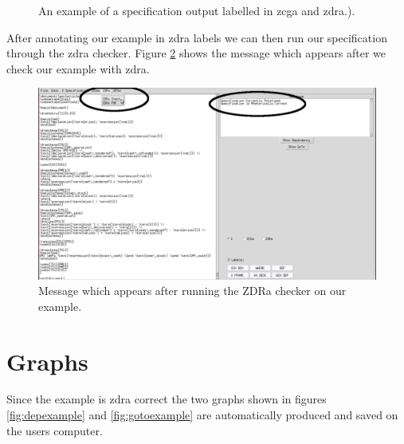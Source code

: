 \begin{figure}[H]
\begin{minipage}{0.45\textwidth}
\vspace{-0.18in}
\caption{An example of a specification output labelled in \gls{zcga} and \gls{zdra}.).\label{fig:zdrazcgaout}}
\vspace{-0.2in}
\end{minipage}
\end{figure}

After annotating our example in \gls{zdra} labels we can then run our specification through the \gls{zdra} checker. Figure \ref{fig:zdracorrect} shows the message which appears after we check our example with \gls{zdra}.

\begin{figure}[H]
\centering
\includegraphics[scale=0.3]{Figures/fullexample/zdracorrect.png}
\caption{Message which appears after running the ZDRa checker on our example. \label{fig:zdracorrect}}
\end{figure}

\section{Graphs}

Since the example is \gls{zdra} correct the two graphs shown in figures \ref{fig:depexample} and \ref{fig:gotoexample} are automatically produced and saved on the users computer.

